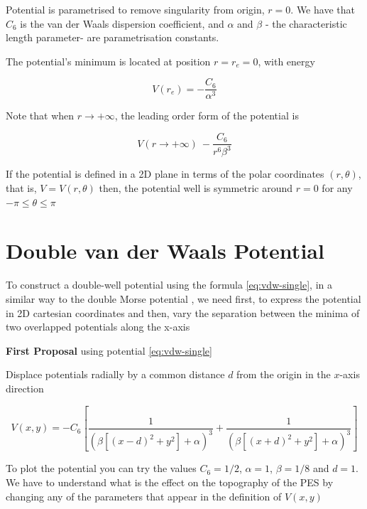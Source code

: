 \documentclass[10pt,aps,onecolumn,superscriptaddress]{revtex4-2}
\begin{document}
Potential is parametrised to remove singularity from origin, $r = 0$. We have that $C_6$ is the van der Waals dispersion coefficient, and $\alpha$ and $\beta$  - the characteristic length parameter- are parametrisation constants.

The potential's minimum is located at position $r = r_e = 0$, with energy 

\begin{equation*}
    V\left( r_e \right) = - \frac{C_6}{\alpha^3}
\end{equation*}

Note that when $r \longrightarrow +\infty $, the leading order form of the potential is

\begin{equation*}
    V(r \longrightarrow +\infty) ~ - \frac{C_6}{r^6 \beta^3}
\end{equation*}

If the potential is defined in a 2D plane in terms of the polar coordinates $(r, \theta)$, that is, $V = V(r, \theta)$ then, the potential well is symmetric around $r = 0$ for any $ -\pi \leq \theta \leq \pi$

\section{Double van der Waals Potential}

To construct a double-well potential using the formula \eqref{eq:vdw-single}, in a similar way to the double Morse potential \cite{GonzalezMontoya2020}, we need first, to express the potential in 2D cartesian coordinates and then, vary the separation between the minima of two overlapped potentials along the x-axis

\textbf{First Proposal} using potential \eqref{eq:vdw-single}

Displace potentials radially by a common distance $d$ from the origin in the $x$-axis direction




\begin{equation}
    V(x, y) = -C_6 \left[ \dfrac{1}{\left(\beta\left[\left(x - d\right)^2 + y^2\right] + \alpha\right)^3} + \dfrac{1}{\left(\beta\left[\left(x + d\right)^2 + y^2\right] + \alpha\right)^3} \right]
    \label{eq:vdw-double}
\end{equation}

To plot the potential you can try the values $C_6 = 1/2$, $\alpha = 1$, $\beta = 1/8$ and $d = 1$. We have to understand what is the effect on the topography of the PES by changing any of the parameters that appear in the definition of $V(x,y)$
\end{document}
